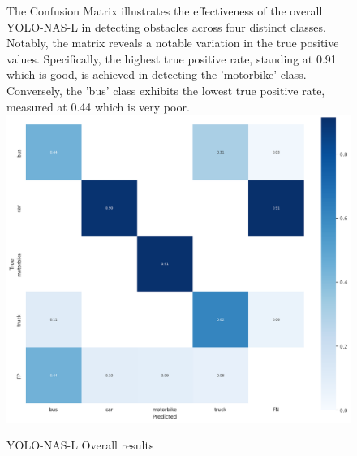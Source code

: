 \begin{figure}[H]
The Confusion Matrix illustrates the effectiveness of the overall YOLO-NAS-L in detecting obstacles across four distinct classes. Notably, the matrix reveals a notable variation in the true positive values. Specifically, the highest true positive rate, standing at 0.91 which is good, is achieved in detecting the 'motorbike' class. Conversely, the 'bus' class exhibits the lowest true positive rate, measured at 0.44 which is very poor.  
    \centering
    \includegraphics[width=\linewidth]{tex/img/YNL2_CM.png}
    \caption{YOLO-NAS-L Overall results }
    \label{fig:ConfusionMatrixY-N-L}
\end{figure}



\newpage

